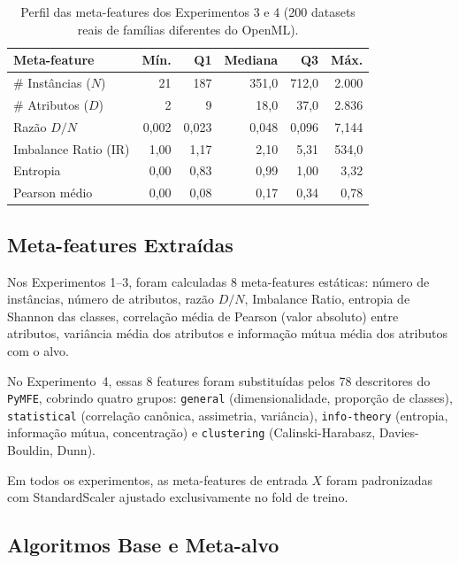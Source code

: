 \documentclass[12pt]{article}
\begin{document}
\begin{table}[ht]
\centering
\caption{Perfil das meta-features dos Experimentos 3 e 4 (200 datasets reais de famílias diferentes do OpenML).}
\label{tab:metadataset_profile}
\small
\begin{tabular}{lrrrrr}
\toprule
\textbf{Meta-feature} & \textbf{Mín.} & \textbf{Q1} & \textbf{Mediana} & \textbf{Q3} & \textbf{Máx.} \\
\midrule
\# Instâncias ($N$)   & 21    & 187    & 351,0   & 712,0    & 2.000 \\
\# Atributos ($D$)    & 2     & 9      & 18,0    & 37,0     & 2.836 \\
Razão $D/N$          & 0,002 & 0,023  & 0,048   & 0,096    & 7,144 \\
Imbalance Ratio (IR)  & 1,00  & 1,17   & 2,10    & 5,31     & 534,0 \\
Entropia              & 0,00  & 0,83   & 0,99    & 1,00     & 3,32  \\
Pearson médio         & 0,00  & 0,08   & 0,17    & 0,34     & 0,78  \\
\bottomrule
\end{tabular}
\end{table}

\subsection{Meta-features Extraídas}

Nos Experimentos 1--3, foram calculadas 8 meta-features estáticas: número de instâncias, número de atributos, razão $D/N$, Imbalance Ratio, entropia de Shannon das classes, correlação média de Pearson (valor absoluto) entre atributos, variância média dos atributos e informação mútua média dos atributos com o alvo.

No Experimento~4, essas 8 features foram substituídas pelos 78 descritores do \texttt{PyMFE}, cobrindo quatro grupos: \texttt{general} (dimensionalidade, proporção de classes), \texttt{statistical} (correlação canônica, assimetria, variância), \texttt{info-theory} (entropia, informação mútua, concentração) e \texttt{clustering} (Calinski-Harabasz, Davies-Bouldin, Dunn).

Em todos os experimentos, as meta-features de entrada $X$ foram padronizadas com StandardScaler ajustado exclusivamente no fold de treino.

\subsection{Algoritmos Base e Meta-alvo}
\end{document}
